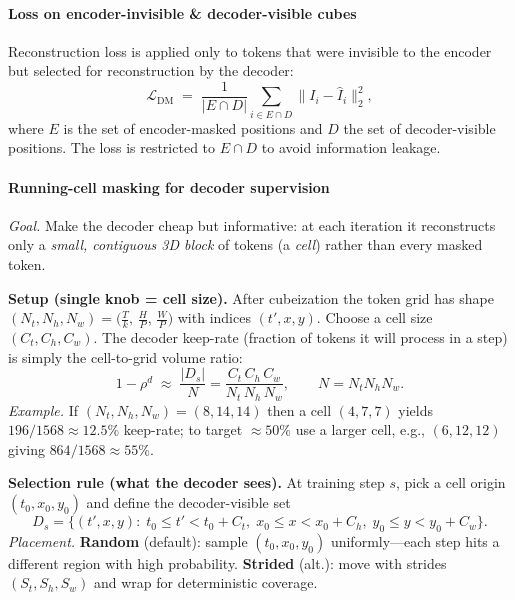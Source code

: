 \begin{enrichment}
\begin{enrichment}
            \paragraph{Loss on encoder-invisible \& decoder-visible cubes}
            Reconstruction loss is applied only to tokens that were invisible to the encoder but selected for reconstruction by the decoder:
            \begin{equation}
                \mathcal{L}_{\mathrm{DM}} \;=\; \frac{1}{|E \cap D|}\sum_{i \in E \cap D} \|I_i - \hat I_i\|_2^2,
                \label{eq:chapter24_videomaev2_loss}
            \end{equation}
            where $E$ is the set of encoder-masked positions and $D$ the set of decoder-visible positions. The loss is restricted to $E\cap D$ to avoid information leakage.
            
            \paragraph{Running-cell masking for decoder supervision}
            \textit{Goal.} Make the decoder cheap but informative: at each iteration it reconstructs only a \emph{small, contiguous 3D block} of tokens (a \emph{cell}) rather than every masked token.
            
            \medskip
            \noindent\textbf{Setup (single knob = cell size).}
            After cubeization the token grid has shape
            \(
            (N_t,N_h,N_w)=\big(\tfrac{T}{k},\,\tfrac{H}{P},\,\tfrac{W}{P}\big)
            \)
            with indices $(t',x,y)$. Choose a cell size $(C_t,C_h,C_w)$.
            The decoder keep-rate (fraction of tokens it will process in a step) is simply the cell-to-grid volume ratio:
            \[
            1-\rho^d \;\approx\; \frac{|D_s|}{N}
            = \frac{C_t\,C_h\,C_w}{N_t\,N_h\,N_w},\qquad N=N_tN_hN_w.
            \]
            \emph{Example.} If $(N_t,N_h,N_w)=(8,14,14)$ then a cell $(4,7,7)$ yields $196/1568\approx12.5\%$ keep-rate; to target $\approx50\%$ use a larger cell, e.g., $(6,12,12)$ giving $864/1568\approx55\%$.
            
            \newpage 
            
            \noindent\textbf{Selection rule (what the decoder sees).}
            At training step $s$, pick a cell origin $(t_0,x_0,y_0)$ and define the decoder-visible set
            \[
            D_s=\big\{(t',x,y):\;
            t_0 \le t' < t_0{+}C_t,\;
            x_0 \le x < x_0{+}C_h,\;
            y_0 \le y < y_0{+}C_w\big\}.
            \]
            \emph{Placement.} \textbf{Random} (default): sample $(t_0,x_0,y_0)$ uniformly—each step hits a different region with high probability. \textbf{Strided} (alt.): move with strides $(S_t,S_h,S_w)$ and wrap for deterministic coverage.
            

\end{enrichment}
\end{enrichment}
